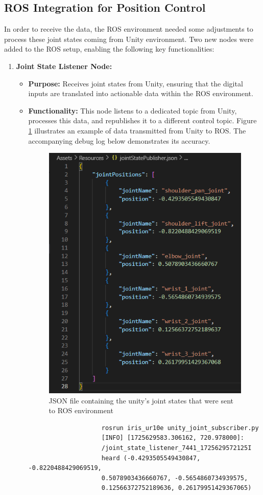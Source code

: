    \subsection{ROS Integration for Position Control}
    In order to receive the data, the ROS environment needed some adjustments to process these joint states coming from Unity environment. Two new nodes were added to the ROS setup, enabling the following key functionalities:
    \begin{enumerate}
        \item \textbf{Joint State Listener Node:}
        \begin{itemize}
            \item \textbf{Purpose:} Receives joint states from Unity, ensuring that the digital inputs are translated into actionable data within the ROS environment.
            \item \textbf{Functionality:} This node listens to a dedicated topic from Unity, processes this data, and republishes it to a different control topic. Figure \ref{fig:json_sent_ros} illustrates an example of data transmitted from Unity to ROS. The accompanying debug log below demonstrates its accuracy.

            \begin{figure}
                \centering
                \includegraphics[width=0.5\linewidth]{figs/json_publisher_14h25.png}
                \caption{JSON file containing the unity's joint states that were sent to ROS environment}
                \label{fig:json_sent_ros}
            \end{figure}
            \begin{verbatim}
                    rosrun iris_ur10e unity_joint_subscriber.py 
                    [INFO] [1725629583.306162, 720.978000]: 
                    /joint_state_listener_7441_1725629572125I 
                    heard (-0.4293505549430847, -0.8220488429069519,
                    0.5078903436660767, -0.5654860734939575,
                    0.12566372752189636, 0.26179951429367065)
            \end{verbatim}
        \end{itemize}
            

\end{enumerate}
